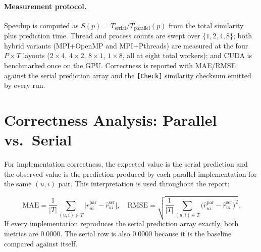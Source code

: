 \documentclass[11pt,a4paper]{article}
\newcommand{\code}[1]{\texttt{\small #1}}
\begin{document}
\paragraph{Measurement protocol.} Speedup is computed as
$S(p) = T_{\text{serial}} / T_{\text{parallel}}(p)$ from the total
similarity plus prediction time. Thread and process counts are swept over
$\{1,2,4,8\}$; both hybrid variants (MPI+OpenMP and MPI+Pthreads) are measured
at the four $P\times T$ layouts ($2\times4$, $4\times2$, $8\times1$,
$1\times8$, all at eight total workers); and CUDA is benchmarked once on the GPU. Correctness is
reported with MAE/RMSE against the serial prediction array and the
\code{[Check]} similarity checksum emitted by every run.

\section{Correctness Analysis: Parallel vs.\ Serial}\label{sec:accuracy}

For implementation correctness, the expected value is the serial prediction and
the observed value is the prediction produced by each parallel implementation
for the same $(u,i)$ pair. This interpretation is used throughout the report:

\[
  \text{MAE} = \frac{1}{|T|} \sum_{(u,i) \in T}
        \bigl|\hat{r}^{\text{par}}_{ui} - \hat{r}^{\text{ser}}_{ui}\bigr|,
  \quad
  \text{RMSE} = \sqrt{\frac{1}{|T|} \sum_{(u,i) \in T}
        \bigl(\hat{r}^{\text{par}}_{ui} - \hat{r}^{\text{ser}}_{ui}\bigr)^2}.
\]
If every implementation reproduces the serial prediction array exactly, both
metrics are $0.0000$. The serial row is also $0.0000$ because it is
the baseline compared against itself.
\end{document}
